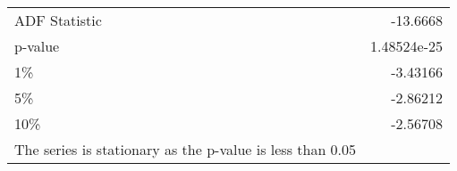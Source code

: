 \begin{tabular}{lr}
\hline
 ADF Statistic                                             & -13.6668      \\
 p-value                                                   &   1.48524e-25 \\
 1\%                                                        &  -3.43166     \\
 5\%                                                        &  -2.86212     \\
 10\%                                                       &  -2.56708     \\
 The series is stationary as the p-value is less than 0.05 &               \\
\hline
\end{tabular}